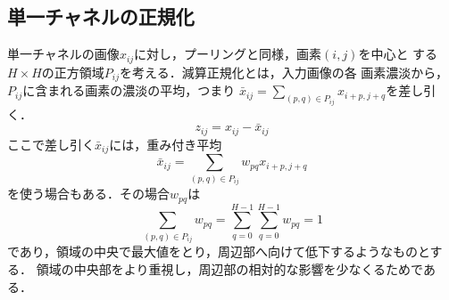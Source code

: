 \documentclass[a4paper,10pt]{jsarticle}
\begin{document}



\subsection{単一チャネルの正規化}
単一チャネルの画像$x_{ij}$に対し，プーリングと同様，画素$(i,j)$を中心と
する$H\times H$の正方領域$P_{ij}$を考える．減算正規化とは，入力画像の各
画素濃淡から，$P_{ij}$に含まれる画素の濃淡の平均，つまり
$\bar{x}_{ij}= \sum_{(p,q)\in{P_{ij}}}^{} x_{i+p,j+q}$を差し引く．
\begin{equation}
 z_{ij} = x_{ij}-\bar{x}_{ij} 
\end{equation}
ここで差し引く$\bar{x}_{ij}$には，重み付き平均
\begin{equation}
 \bar{x}_{ij}=\sum_{(p,q)\in{P_{ij}}} w_{pq}x_{i+p,j+q}
\end{equation}
を使う場合もある．その場合$w_{pq}$は
\begin{equation}
  \sum_{(p,q)\in{P_{ij}}}^{} w_{pq} = \sum_{q=0}^{H-1} \sum_{q=0}^{H-1} w_{pq}=1
\end{equation}
であり，領域の中央で最大値をとり，周辺部へ向けて低下するようなものとする．
領域の中央部をより重視し，周辺部の相対的な影響を少なくるためである．
\end{document}

